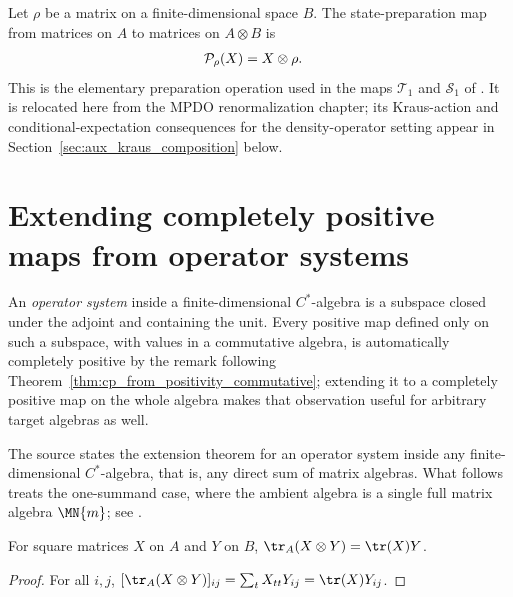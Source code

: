 \begin{definition}
    \label{def:mpdo_state_preparation_map}
    \leanok
    Let $\rho$ be a matrix on a finite-dimensional space $B$. The
    state-preparation map from matrices on $A$ to matrices on $A\otimes B$ is
    \begin{align}
        \mathcal P_\rho(X)&=X\otimes\rho.
        \notag
    \end{align}
    This is the elementary preparation operation used in the maps
    $\mathcal T_1$ and $\mathcal S_1$ of
    \cite[Appendix~C.2, lines~1527--1533 and~1551--1555]{Cirac2016MPDO_arXiv}.
    It is relocated here from the MPDO renormalization chapter; its
    Kraus-action and conditional-expectation consequences for the
    density-operator setting appear in
    Section~\ref{sec:aux_kraus_composition} below.
\end{definition}

\section{Extending completely positive maps from operator systems}

An \emph{operator system} inside a finite-dimensional $C^*$-algebra is a
subspace closed under the adjoint and containing the unit. Every positive
map defined only on such a subspace, with values in a commutative algebra,
is automatically completely positive by the remark following
Theorem~\ref{thm:cp_from_positivity_commutative}; extending it to a
completely positive map on the whole algebra makes that observation useful
for arbitrary target algebras as well.

The source states the extension theorem for an operator system inside any
finite-dimensional $C^*$-algebra, that is, any direct sum of matrix
algebras. What follows treats the one-summand case, where the ambient
algebra is a single full matrix algebra $\MN{m}$; see
\cite{gap:wolf_ch01_operator_system_extension_matrix_scope}.

\begin{theorem}
    \label{thm:mpdo_left_partial_trace_kronecker}
    \leanok
    For square matrices $X$ on $A$ and $Y$ on $B$,
    $\tr_{A}(X\otimes Y)=\tr(X)Y$.
\end{theorem}
\begin{proof}
    \leanok
    For all $i,j$,
    $[\tr_{A}(X\otimes Y)]_{ij}
    =\sum_t X_{tt}Y_{ij}=\tr(X)Y_{ij}$.
\end{proof}

